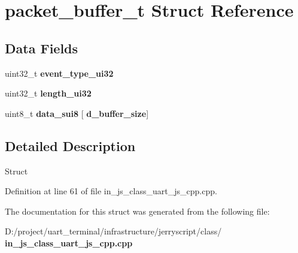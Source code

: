 \section{packet\+\_\+buffer\+\_\+t Struct Reference}
\label{structpacket__buffer__t}
\subsection*{Data Fields}
\begin{DoxyCompactItemize}
\item 
\mbox{\label{structpacket__buffer__t_a84289998e2d43ad55adf0f88efe53471}} 
uint32\+\_\+t {\bfseries event\+\_\+type\+\_\+ui32}
\item 
\mbox{\label{structpacket__buffer__t_a6c8efdcf733469856a7b78a0af80ea9a}} 
uint32\+\_\+t {\bfseries length\+\_\+ui32}
\item 
\mbox{\label{structpacket__buffer__t_ace95aee10e6a2bb5a3aff40c04b300fe}} 
uint8\+\_\+t {\bfseries data\+\_\+sui8} [\textbf{ d\+\_\+buffer\+\_\+size}]
\end{DoxyCompactItemize}


\subsection{Detailed Description}
Struct 

Definition at line 61 of file in\+\_\+js\+\_\+class\+\_\+uart\+\_\+js\+\_\+cpp.\+cpp.



The documentation for this struct was generated from the following file\+:\begin{DoxyCompactItemize}
\item 
D\+:/project/uart\+\_\+terminal/infrastructure/jerryscript/class/\textbf{ in\+\_\+js\+\_\+class\+\_\+uart\+\_\+js\+\_\+cpp.\+cpp}\end{DoxyCompactItemize}
